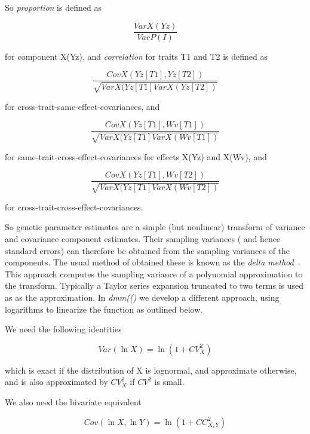 \documentclass[titlepage]{article}  %
\begin{document}
So {\em proportion} is defined as 

\begin{displaymath}
\frac{VarX(Yz)}{VarP(I)}
\end{displaymath}

for component X(Yz), and {\em correlation} for traits T1 and T2  is defined as

\begin{displaymath}
\frac{CovX(Yz[T1],Yz[T2])}{\sqrt{VarX(Yz[T1] VarX(Yz[T2])}}
\end{displaymath}

for cross-trait-same-effect-covariances, and

\begin{displaymath}
\frac{CovX(Yz[T1],Wv[T1])}{\sqrt{VarX(Yz[T1] VarX(Wv[T1])}}
\end{displaymath}

for same-trait-cross-effect-covariances for effects X(Yz) and X(Wv), and

\begin{displaymath}
\frac{CovX(Yz[T1],Wv[T2])}{\sqrt{VarX(Yz[T1] VarX(Wv[T2])}}
\end{displaymath}

for cross-trait-cross-effect-covariances.

So genetic parameter estimates are a simple (but nonlinear) transform of variance and covariance component estimates.  Their sampling variances ( and hence standard errors) can therefore be obtained from the sampling variances of the components. The usual method of obtained these is known as the {\em delta method}~\cite{anon:14}. This approach computes the sampling variance of a polynomial approximation to the transform. Typically a Taylor series expansion truncated to two terms is used as as the approximation. In {\em dmm(()} we develop a different approach, using logarithms to linearize the function as outlined below.

 We need the following identities

\begin{displaymath}
Var(\ln X) = \ln(1 + CV^{2}_{X})
\end{displaymath}

which is exact if the distribution of X is lognormal, and approximate otherwise, and is also approximated by $CV^{2}_{X}$ if $CV^{2}$ is small.

We also need the bivariate equivalent

\begin{displaymath}
Cov(\ln X, \ln Y) = \ln(1 + CC^{2}_{X,Y})
\end{displaymath}
\end{document}
